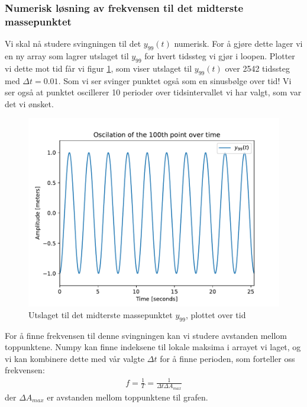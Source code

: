 \documentclass[12p,a4paper]{report}
\begin{document}
\subsubsection*{Numerisk løsning av frekvensen til det midterste massepunktet}
Vi skal nå studere svingningen til det $y_{99}(t)$ numerisk. For å gjøre dette lager vi en ny array som lagrer utslaget til $y_{99}$ for hvert tidssteg vi gjør i loopen. Plotter vi dette mot tid får vi figur \ref{fig:100_point}, som viser utslaget til $y_{99}(t)$ over 2542 tidssteg med $\Delta t = 0.01$. Som vi ser svinger punktet også som en sinusbølge over tid! Vi ser også at punktet oscillerer 10 perioder over tidsintervallet vi har valgt, som var det vi ønsket.
\begin{figure}[H]
\centering
\includegraphics[width=\textwidth]{../fig/100_point_oscilation.pdf}
\caption{Utslaget til det midterste massepunktet $y_{99}$, plottet over tid}
\label{fig:100_point}
\end{figure}

For å finne frekvensen til denne svingningen kan vi studere avstanden mellom toppunktene. Numpy kan finne indeksene til lokale maksima i arrayet vi laget, og vi kan kombinere dette med vår valgte $\Delta t$ for å finne perioden, som forteller oss frekvensen:
\begin{align*}
f = \frac{1}{T} = \frac{1}{\Delta t \Delta A_{max}}
\end{align*}
der $\Delta A_{max}$ er avstanden mellom toppunktene til grafen.
\end{document}
